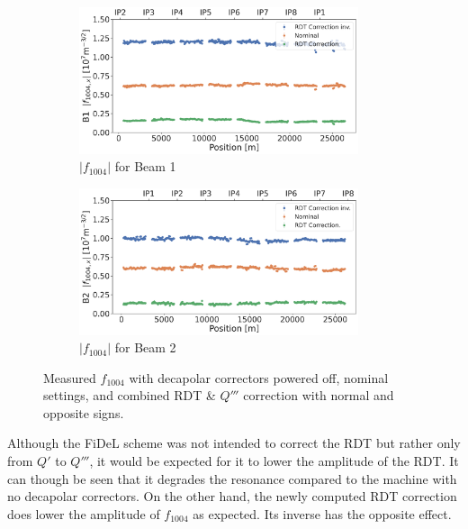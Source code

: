 \begin{figure}[!htb]
    \centering
    \begin{subfigure}{1\textwidth}
        \includegraphics[width=0.9\textwidth]{./images/f1004/f1004x_corrections_B1.pdf}
        \caption{$|f_{1004}|$ for Beam 1}
        \vspace{0.5cm}
    \end{subfigure}
    \begin{subfigure}{1\textwidth}
        \includegraphics[width=0.9\textwidth]{./images/f1004/f1004x_corrections_B2.pdf}
        \caption{$|f_{1004}|$ for Beam 2}
    \end{subfigure}
    \caption{Measured $f_{1004}$ with decapolar correctors powered off, nominal settings, and
    combined RDT \& $Q'''$ correction with normal and opposite signs.}
    \label{fig:decapoles:rdts:f1004_correction_B2}
\end{figure}


Although the FiDeL scheme was not intended to correct the RDT but rather only from $Q'$ to $Q'''$,
it would be expected for it to lower the amplitude of the RDT. It can though be seen that it
degrades the resonance compared to the machine with no decapolar correctors. On the other hand, the
newly computed RDT correction does lower the amplitude of $f_{1004}$ as expected.  Its inverse has
the opposite effect.

